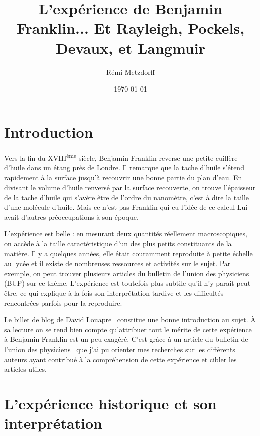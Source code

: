 \documentclass[12pt,a4paper]{article}
\title{L'expérience de Benjamin Franklin... Et Rayleigh, Pockels, Devaux, et Langmuir}
\author{Rémi Metzdorff}
\date{\today}
\begin{document}
\maketitle

\tableofcontents
\newpage

\section*{Introduction}

Vers la fin du XVIII\textsuperscript{ème} siècle, Benjamin Franklin reverse une petite cuillère d'huile dans un étang près de Londre.
Il remarque que la tache d'huile s'étend rapidement à la surface jusqu'à recouvrir une bonne partie du plan d'eau.
En divisant le volume d'huile renversé par la surface recouverte, on trouve l'épaisseur de la tache d'huile qui s'avère être de l'ordre du nanomètre, c'est à dire la taille d'une molécule d'huile.
Mais ce n'est pas Franklin qui eu l'idée de ce calcul
Lui avait d'autres préoccupations à son époque.

L'expérience est belle : en mesurant deux quantités réellement macroscopiques, on accède à la taille caractéristique d'un des plus petits constituants de la matière.
Il y a quelques années, elle était couramment reproduite à petite échelle au lycée et il existe de nombreuses ressources et activités sur le sujet.
Par exemple, on peut trouver plusieurs articles du bulletin de l'union des physiciens (BUP) \cite{Carron1992, Schwob2000, Bacciochini2002, Serra2002} sur ce thème.
L'expérience est toutefois plus subtile qu'il n'y parait peut-être, ce qui explique à la fois son interprétation tardive et les difficultés rencontrées parfois pour la reproduire.

Le billet de blog de David Louapre~\cite{Louapre2012} constitue une bonne introduction au sujet.
À sa lecture on se rend bien compte qu'attribuer tout le mérite de cette expérience à Benjamin Franklin est un peu exagéré.
C'est grâce à un article du bulletin de l'union des physiciens~\cite{Bolmont2001} que j'ai pu orienter mes recherches sur les différents auteurs ayant contribué à la compréhension de cette expérience et cibler les articles utiles.

\section{L'expérience historique et son interprétation}
\end{document}
